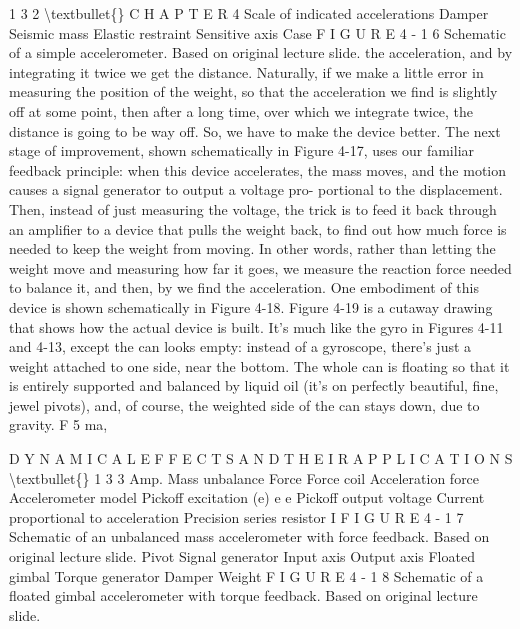 \documentclass[10pt,oneside]{article}
\begin{document}
1 3 2 \textbackslash{}textbullet\{\} C H A P T E R  4 Scale of indicated accelerations Damper Seismic mass Elastic restraint Sensitive axis Case F I G U R E  4 - 1 6 Schematic of a simple accelerometer. Based on original lecture slide. the acceleration, and by integrating it twice we get the distance. Naturally, if we make a little error in measuring the position of the weight, so that the acceleration we find is slightly off at some point, then after a long time, over which we integrate twice, the distance is going to be way off. So, we have to make the device better. The next stage of improvement, shown schematically in Figure 4-17, uses our familiar feedback principle: when this device accelerates, the mass moves, and the motion causes a signal generator to output a voltage pro- portional to the displacement. Then, instead of just measuring the voltage, the trick is to feed it back through an amplifier to a device that pulls the weight back, to find out how much force is needed to keep the weight from moving. In other words, rather than letting the weight move and measuring how far it goes, we measure the reaction force needed to balance it, and then, by we find the acceleration. One embodiment of this device is shown schematically in Figure 4-18. Figure 4-19 is a cutaway drawing that shows how the actual device is built. It’s much like the gyro in Figures 4-11 and 4-13, except the can looks empty: instead of a gyroscope, there’s just a weight attached to one side, near the bottom. The whole can is floating so that it is entirely supported and balanced by liquid oil (it’s on perfectly beautiful, fine, jewel pivots), and, of course, the weighted side of the can stays down, due to gravity. F 5 ma,\par

D Y N A M I C A L  E F F E C T S  A N D  T H E I R  A P P L I C A T I O N S \textbackslash{}textbullet\{\} 1 3 3 Amp. Mass unbalance Force Force coil Acceleration force Accelerometer model Pickoff excitation (e) e e Pickoff output voltage Current proportional to acceleration Precision series resistor I F I G U R E  4 - 1 7 Schematic of an unbalanced mass accelerometer with force feedback. Based on original lecture slide. Pivot Signal generator Input axis Output axis Floated gimbal Torque generator Damper Weight F I G U R E  4 - 1 8 Schematic of a floated gimbal accelerometer with torque feedback. Based on original lecture slide.\par
\end{document}
